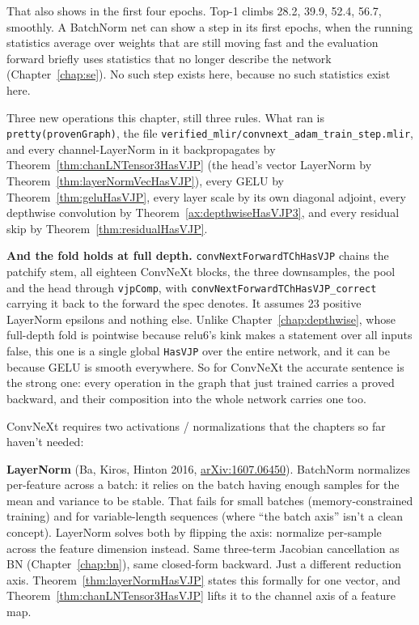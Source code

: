 \medskip\noindent That also shows in the first four epochs. Top-1 climbs
28.2, 39.9, 52.4, 56.7, smoothly. A BatchNorm net can show a step in its first epochs, when the running
statistics average over weights that are still moving fast and the
evaluation forward briefly uses statistics that no longer describe the
network (Chapter~\ref{chap:se}). No such step exists here, because no such
statistics exist here.

Three new operations this chapter, still three rules. What ran is
\texttt{pretty(provenGraph)}, the file
\texttt{verified\_mlir/\allowbreak convnext\_adam\_train\_step.mlir}, and
every channel-LayerNorm in it backpropagates by
Theorem~\ref{thm:chanLNTensor3HasVJP} (the head's vector LayerNorm by
Theorem~\ref{thm:layerNormVecHasVJP}), every GELU by
Theorem~\ref{thm:geluHasVJP}, every layer scale by its own diagonal
adjoint, every depthwise convolution by Theorem~\ref{ax:depthwiseHasVJP3}, and every
residual skip by Theorem~\ref{thm:residualHasVJP}.

\medskip\noindent\textbf{And the fold holds at full depth.}
\texttt{convNextForwardTChHasVJP} chains the patchify stem, all
eighteen ConvNeXt blocks, the three downsamples, the pool and the
head through \texttt{vjpComp}, with
\texttt{convNextForwardTChHasVJP\_correct} carrying it back to the
forward the spec denotes. It assumes 23 positive LayerNorm epsilons and
nothing else. Unlike Chapter~\ref{chap:depthwise}, whose full-depth fold is
pointwise because relu6's kink makes a statement over all inputs false,
this one is a single global \texttt{HasVJP} over the entire network, and it
can be because GELU is smooth everywhere. So for ConvNeXt the accurate sentence is the strong one:
every operation in the graph that just trained carries a proved
backward, and their composition into the whole network carries one too.


ConvNeXt requires two activations / normalizations that the
chapters so far haven't needed:

\textbf{LayerNorm} (Ba, Kiros, Hinton 2016,
\href{https://arxiv.org/abs/1607.06450}{arXiv:1607.06450}). BatchNorm
normalizes per-feature across a batch: it relies on the batch having
enough samples for the mean and variance to be stable. That fails for
small batches (memory-constrained training) and for variable-length
sequences (where ``the batch axis'' isn't a clean concept). LayerNorm
solves both by flipping the axis: normalize per-sample across the
feature dimension instead. Same three-term Jacobian cancellation as
BN (Chapter~\ref{chap:bn}), same closed-form backward. Just a
different reduction axis. Theorem~\ref{thm:layerNormHasVJP} states
this formally for one vector, and Theorem~\ref{thm:chanLNTensor3HasVJP}
lifts it to the channel axis of a feature map.

